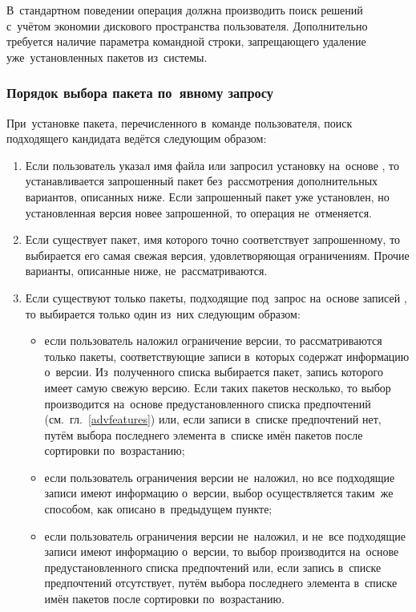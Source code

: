 В~стандартном поведении операция должна производить поиск решений с~учётом экономии дискового пространства пользователя. 
Дополнительно требуется наличие параметра командной строки, запрещающего удаление уже~установленных пакетов из~системы. 

\subsubsection{Порядок выбора пакета по~явному запросу}

При~установке пакета, перечисленного в~команде пользователя, поиск подходящего кандидата ведётся следующим образом:

\begin{enumerate}

\item {
Если пользователь указал имя файла или запросил установку на~основе ,
то устанавливается запрошенный пакет без~рассмотрения дополнительных вариантов, описанных ниже.
Если запрошенный пакет уже установлен, но установленная версия новее запрошенной,
то операция не~отменяется.
}

\item {
Если существует пакет, имя которого точно соответствует запрошенному, то выбирается его самая свежая версия, удовлетворяющая ограничениям. 
Прочие варианты, описанные ниже, не~рассматриваются.
}

\item {
Если существуют только пакеты, подходящие под~запрос на~основе записей ,
то выбирается только один из~них следующим образом:
}

\begin{itemize}

\item {
если пользователь наложил ограничение версии, то рассматриваются только пакеты,
соответствующие записи  в~которых содержат информацию о~версии.
Из~полученного списка выбирается пакет, запись  которого имеет самую свежую версию.
Если таких пакетов несколько, то выбор производится на~основе предустановленного списка предпочтений (см.~гл.~\ref{advfeatures})
или, если записи в~списке предпочтений нет, 
путём выбора последнего элемента в~списке имён пакетов после сортировки по~возрастанию;
}

\item {
если пользователь ограничения версии не~наложил, но все подходящие записи  имеют информацию о~версии,
выбор осуществляется таким~же способом, как описано в~предыдущем пункте;
}

\item {
если пользователь ограничения версии не~наложил, и не~все подходящие записи  имеют информацию о~версии,
то выбор производится на~основе предустановленного списка предпочтений или, 
если запись в~списке предпочтений отсутствует, путём выбора последнего элемента в~списке имён пакетов после сортировки по~возрастанию.
}

\end{itemize}
\end{enumerate}

